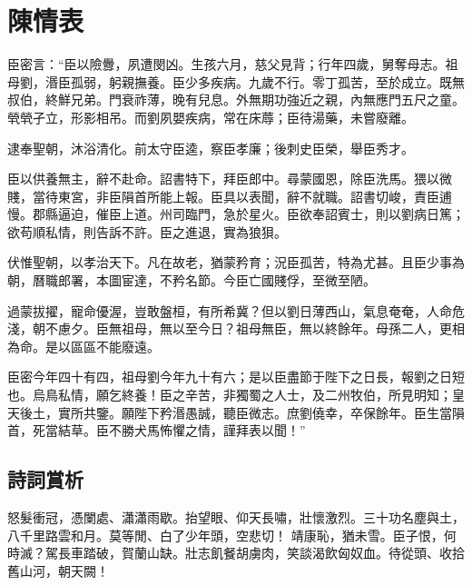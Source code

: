 \chapter{陳情表}

臣密言：“臣以險釁，夙遭閔凶。生孩六月，慈父見背；行年四歲，舅奪母志。祖母劉，湣臣孤弱，躬親撫養。臣少多疾病。九歲不行。零丁孤苦，至於成立。既無叔伯，終鮮兄弟。門衰祚薄，晚有兒息。外無期功強近之親，內無應門五尺之童。煢煢孑立，形影相吊。而劉夙嬰疾病，常在床蓐；臣待湯藥，未嘗廢離。

逮奉聖朝，沐浴清化。前太守臣逵，察臣孝廉；後刺史臣榮，舉臣秀才。

臣以供養無主，辭不赴命。詔書特下，拜臣郎中。尋蒙國恩，除臣洗馬。猥以微賤，當待東宮，非臣隕首所能上報。臣具以表聞，辭不就職。詔書切峻，責臣逋慢。郡縣逼迫，催臣上道。州司臨門，急於星火。臣欲奉詔賓士，則以劉病日篤；欲苟順私情，則告訴不許。臣之進退，實為狼狽。

伏惟聖朝，以孝治天下。凡在故老，猶蒙矜育；況臣孤苦，特為尤甚。且臣少事為朝，曆職郎署，本圖宦達，不矜名節。今臣亡國賤俘，至微至陋。

過蒙拔擢，寵命優渥，豈敢盤桓，有所希冀？但以劉日薄西山，氣息奄奄，人命危淺，朝不慮夕。臣無祖母，無以至今日？祖母無臣，無以終餘年。母孫二人，更相為命。是以區區不能廢遠。

臣密今年四十有四，祖母劉今年九十有六；是以臣盡節于陛下之日長，報劉之日短也。烏鳥私情，願乞終養！臣之辛苦，非獨蜀之人士，及二州牧伯，所見明知；皇天後土，實所共鑒。願陛下矜湣愚誠，聽臣微志。庶劉僥幸，卒保餘年。臣生當隕首，死當結草。臣不勝犬馬怖懼之情，謹拜表以聞！”

\section{詩詞賞析}
怒髮衝冠，憑闌處、瀟瀟雨歇。抬望眼、仰天長嘯，壯懷激烈。三十功名塵與土，八千里路雲和月。莫等閒、白了少年頭，空悲切！ 靖康恥，猶未雪。臣子恨，何時滅？駕長車踏破，賀蘭山缺。壯志飢餐胡虜肉，笑談渴飲匈奴血。待從頭、收拾舊山河，朝天闕！
